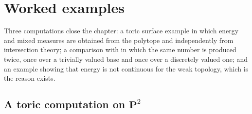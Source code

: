 \section{Worked examples}
\label{sec:ch46-examples}

Three computations close the chapter: a toric surface example in which
energy and mixed measures are obtained from the polytope and independently
from intersection theory; a comparison with  in which the
same number is produced twice, once over a trivially valued base and once
over a discretely valued one; and an example showing that energy is not
continuous for the weak topology, which is the reason
 exists.

\subsection{A toric computation on \texorpdfstring{$\mathbf P^2$}{P2}}
\label{sec:ch46-toric}

